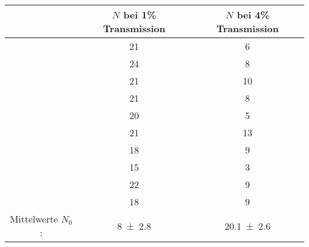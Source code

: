 \begin{tabular}{SSS}
\toprule
&{$N$ bei 1\% Transmission}  & {$N$ bei 4\% Transmission}   \\ \midrule
& 21     & 6         \\
& 24     & 8         \\
& 21     & 10        \\
& 21     & 8         \\
& 20     & 5         \\
& 21     & 13        \\
& 18     & 9         \\
& 15     & 3         \\
& 22     & 9         \\
& 18     & 9         \\\midrule
{Mittelwerte $N_0$:} & {\num{8+-2.8}} & {\num{20.1+-2.6}} \\ \bottomrule
\end{tabular}
